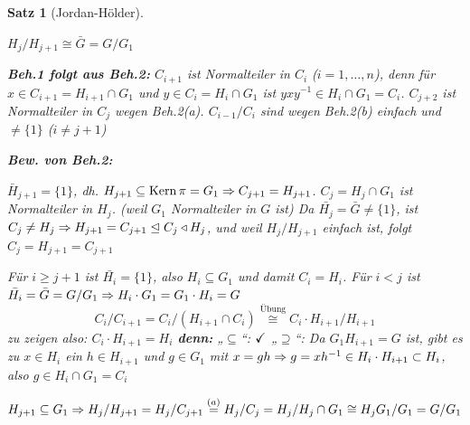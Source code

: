 \documentclass[a4paper,10pt,german]{scrbook}
\theoremstyle{saetze}
\newtheorem{Satz}{Satz}
\theoremstyle{definitionen}
\begin{document}
\begin{Satz}[Jordan-Hölder]
{\begin{description}
\begin{enum}
\item $H_j/H_{j+1} \cong \bar G = G/G_1$
\end{enum}
\smallskip\textbf{Beh.1 folgt aus Beh.2:}
\newline $C_{i+1}$ ist Normalteiler in $C_{i}$ ($i=1,\dots,n$), denn für 
$x \in C_{i+1} = H_{i+1} \cap G_1$ und $y \in C_i = H_{i} \cap G_1$ ist $yxy^{-1} \in H_i \cap G_1 = C_i$.
\newline $C_{j+2}$ ist Normalteiler in $C_j$ wegen Beh.2(a).
\newline $C_{i-1}/C_i$ sind wegen Beh.2(b) einfach und $\neq \{1\}$
($i\neq j+1$) 

\pagebreak[1]
\textbf{Bew. von Beh.2:}\nopagebreak
\begin{enum}
\item $\bar{H}_{j+1} = \{1\}$, dh. $H_{j+1} \subseteq \mathop{\rm Kern}\nolimits{\pi} = G_1 \Rightarrow C_{j+1} =
H_{j+1}$. $C_j = H_j \cap G_1$ ist Normalteiler in $H_j$. (weil $G_1$
Normalteiler in $G$ ist)
\newline Da $\bar{H_j} = \bar G \neq \{1\}$, ist $C_j \neq H_j \Rightarrow H_{j+1} = C_{j+1}
\trianglelefteq C_j \triangleleft H_j$, und weil $H_j/H_{j+1}$ einfach ist, folgt $C_j = H_{j+1} = C_{j+1}$
\item Für $i \geq j+1$ ist $\bar{H_i} = \{1\}$, also $H_i \subseteq
G_1$ und damit $C_i = H_i$.
\newline Für $i < j$ ist $\bar{H_i} = \bar G = G/G_1 \Rightarrow H_i\cdot G_1
= G_1\cdot H_i = G$
\[ C_{i}/C_{i+1} = C_{i}/(H_{i+1} \cap C_{i})
\overset{\text{Übung}}{\cong} 
C_{i}\cdot H_{i+1}/H_{i+1}\] zu zeigen also: $C_{i}\cdot H_{i+1} = H_{i}$
\smallskip\newline \textbf{denn:}
„$\subseteq$“: $\checkmark$
\newline „$\supseteq$“: Da $G_1 H_{i+1} = G$ ist, gibt es zu $x \in
H_{i}$ ein $h \in H_{i+1}$ und $g \in G_1$ mit $x=gh \Rightarrow g=xh^{-1} \in H_i \cdot H_{i+1} \subset H_i$, also $g \in H_{i}
\cap G_1 = C_{i}$
\item $\displaystyle H_{j+1} \subseteq G_1 \Rightarrow H_j/H_{j+1} = H_j/C_{j+1}
\overset{(a)}{=} H_j/C_j = H_j/H_j \cap G_1 \cong H_j G_1/G_1 = G/G_1$ 
\end{enum}\end{description}}
\end{Satz}
\end{document}
